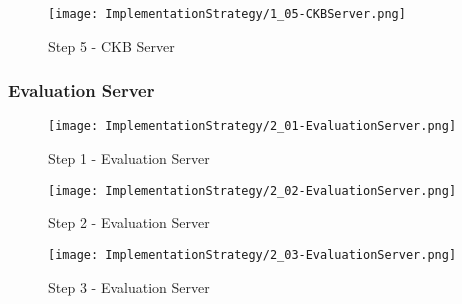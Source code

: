 \begin{figure}[H]
    \label{fig:step5-CKBServer}
    \centering
    \texttt{[image: ImplementationStrategy/1\_05-CKBServer.png]}
    \caption{Step 5 - CKB Server}
\end{figure}
\pagebreak

\subsubsection{Evaluation Server}

\begin{figure}[H]
    \label{fig:step1-EvaluationServer}
    \centering
    \texttt{[image: ImplementationStrategy/2\_01-EvaluationServer.png]}
    \caption{Step 1 - Evaluation Server}
\end{figure}

\begin{figure}[H]
    \label{fig:step2-EvaluationServer}
    \centering
    \texttt{[image: ImplementationStrategy/2\_02-EvaluationServer.png]}
    \caption{Step 2 - Evaluation Server}
\end{figure}

\begin{figure}[H]
    \label{fig:step3-EvaluationServer}
    \centering
    \texttt{[image: ImplementationStrategy/2\_03-EvaluationServer.png]}
    \caption{Step 3 - Evaluation Server}
\end{figure}
